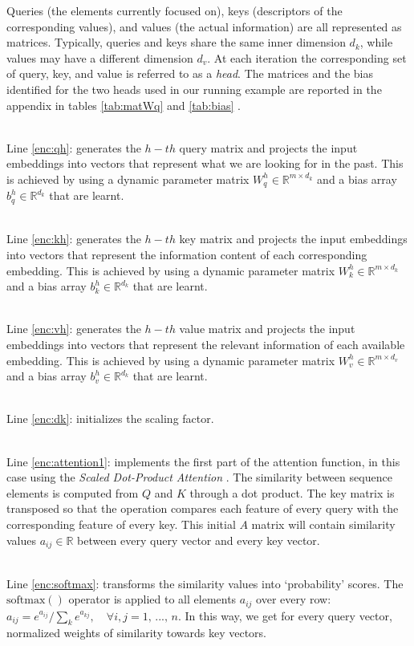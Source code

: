 \documentclass[algorithms,article,submit,pdftex,moreauthors]{Definitions/mdpi}
\begin{document}
Queries (the elements currently focused on), keys (descriptors of the corresponding values), and values (the actual information) are all represented as matrices. Typically, queries and keys share the same inner dimension $d_k$, while values may have a different dimension $d_v$. At each iteration the corresponding set of query, key, and value is referred to as a \textit{head}. The matrices and the bias identified for the two heads used in our running example are reported in the appendix in tables \ref{tab:matWq} and \ref{tab:bias} .

~\\Line \ref{enc:qh}: generates the $h-th$ query matrix and projects the input embeddings into vectors that represent what we are looking for in the past. This is achieved by using a dynamic parameter matrix $W^h_q \in \mathbb{R}^{m \times d_k}$ and a bias array $b^h_q \in \mathbb{R}^{d_k}$ that are learnt.

~\\Line \ref{enc:kh}: generates the $h-th$ key matrix and projects the input embeddings into vectors that represent the information content of each corresponding embedding. This is achieved by using a dynamic parameter matrix $W^h_k \in \mathbb{R}^{m \times d_k}$ and a bias array $b^h_k \in \mathbb{R}^{d_k}$ that are learnt.

~\\Line \ref{enc:vh}: generates the $h-th$ value matrix and projects the input embeddings into vectors that represent the relevant information of each available embedding. This is achieved by using a dynamic parameter matrix $W^h_v \in \mathbb{R}^{m \times d_v}$ and a bias array $b^h_v \in \mathbb{R}^{d_k}$ that are learnt.

~\\Line \ref{enc:dk}: initializes the scaling factor.

~\\Line \ref{enc:attention1}: implements the first part of the attention function, in this case using the \textit{Scaled Dot-Product Attention} \cite{VSPU17}. The similarity between sequence elements is computed from $Q$ and $K$ through a dot product. The key matrix is transposed so that the operation compares each feature of every query with the corresponding feature of every key. This initial $A$ matrix will contain similarity values $a_{ij} \in \mathbb{R}$ between every query vector and every key vector. 

~\\Line \ref{enc:softmax}: transforms the similarity values into `probability' scores. The $\text{softmax}()$ operator is applied to all elements $a_{ij}$ over every row: $a_{ij} = e^{a_{ij}} / \sum_k e^{a_{kj}},\quad \forall i,j  = 1,\,...,\,n $. In this way, we get for every query vector, normalized weights of similarity towards key vectors. 
\end{document}
